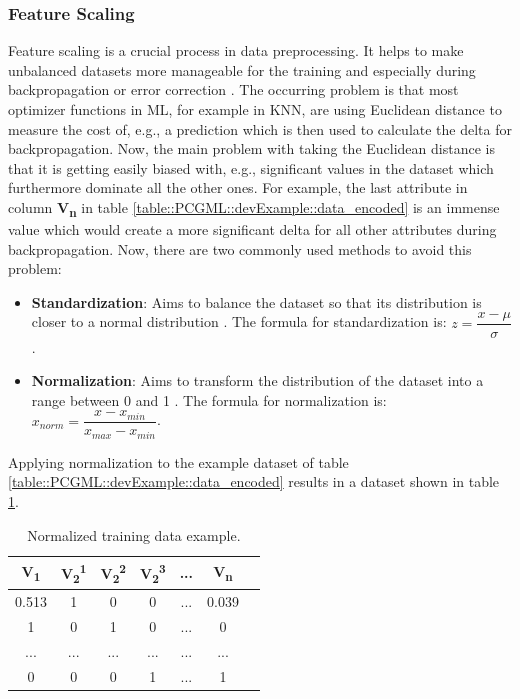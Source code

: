 \documentclass[MGS,Master,english]{twbook}%
\begin{document}
\subsubsection{Feature Scaling} %
Feature scaling is a crucial process in data preprocessing. It helps to make unbalanced datasets more manageable for the training and especially during backpropagation or error correction \cite{ml::book::developer}. The occurring problem is that most optimizer functions in ML, for example in \ac{KNN}, are using Euclidean distance to measure the cost of, e.g., a prediction which is then used to calculate the delta for backpropagation. Now, the main problem with taking the Euclidean distance is that it is getting easily biased with, e.g., significant values in the dataset which furthermore dominate all the other ones. For example, the last attribute in column \textbf{V\textsubscript{n}} in table \ref{table::PCGML::devExample::data_encoded} is an immense value which would create a more significant delta for all other attributes during backpropagation. Now, there are two commonly used methods to avoid this problem:
\begin{itemize}
	\item \textbf{Standardization}: Aims to balance the dataset so that its distribution is closer to a normal distribution \cite{ml::book::developer}. The formula for standardization is: $z={\dfrac{x - \mu}{\sigma}}$.
	\item \textbf{Normalization}: Aims to transform the distribution of the dataset into a range between 0 and 1 \cite{ml::book::developer}. The formula for normalization is: $x_{norm}={\dfrac{x - x_{min}}{x_{max}-x_{min}}}$.
\end{itemize}
Applying normalization to the example dataset of table \ref{table::PCGML::devExample::data_encoded} results in a dataset shown in table \ref{table::PCGML::devExample::data_normalized}.
\begin{table}[!ht]
	\centering
	\begin{tabular}{|c|c|c|c|c|c|c|}
		\hline
		\textbf{V\textsubscript{1}} & \textbf{V\textsubscript{2}\textsuperscript{1}}& \textbf{V\textsubscript{2}\textsuperscript{2}}& \textbf{V\textsubscript{2}\textsuperscript{3}} & \textbf{...} & \textbf{V\textsubscript{n}} \\ \hline\hline
		0.513      & 1   & 0   & 0       & ...          & 0.039         \\ \hline
		1           & 0   & 1   & 0       & ...          & 0          \\ \hline
		...         & ... & ... & ...     & ...          & ...         \\ \hline
		0      & 0   & 0   & 1       & ...          & 1         \\ \hline
	\end{tabular}
	\caption{Normalized training data example.}
	\label{table::PCGML::devExample::data_normalized}
\end{table}
\end{document}
